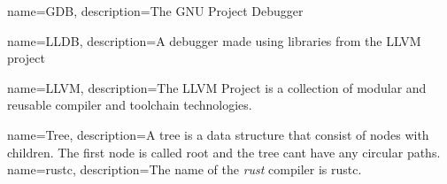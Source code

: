 {
    name=GDB,
    description={The GNU Project Debugger}
}

{
    name=LLDB,
    description={A debugger made using libraries from the LLVM project}
}

{
    name=LLVM,
    description={The LLVM Project is a collection of modular and reusable compiler and toolchain technologies.}
}

{
    name=Tree,
    description={A tree is a data structure that consist of nodes with children. The first node is called root and the tree cant have any circular paths.}
}
{
    name=rustc,
    description={The name of the \emph{rust} compiler is rustc.}
}








